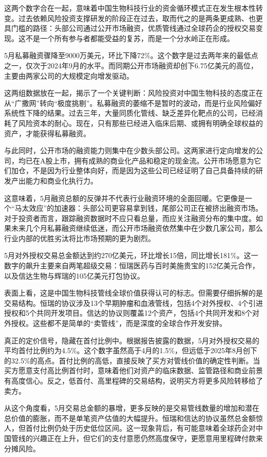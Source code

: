 \documentclass[11pt]{ctexart}
\begin{document}
这两个数字合在一起，意味着中国生物科技行业的资金循环模式正在发生根本性转变。过去依赖风险投资支撑研发的阶段正在过去，取而代之的是两条更成熟、也更具门槛的路径：头部公司通过公开市场融资，优质管线通过全球药企的授权交易变现。这不是一个所有参与者都能受益的复苏，而是一个分水岭正在形成。

5月私募融资骤降至9000万美元，环比下降72\%。这个数字是过去两年来的最低点之一，仅次于2024年9月的水平。而同期公开市场融资却创下6.75亿美元的高位，主要由两家公司的大规模定向增发驱动。

这两组数据放在一起，揭示了一个关键判断：风险投资对中国生物科技的态度正在从“广撒网”转向“极度挑剔”。私募融资的萎缩不是暂时的波动，而是行业风险偏好系统性下降的结果。过去三年，大量同质化管线、缺乏差异化靶点的公司，已经消耗了风险资本的耐心。现在，只有那些已经进入临床后期、或拥有明确全球权益的资产，才能获得私募融资。

与此同时，公开市场的融资能力则集中在少数头部公司。这两家进行定向增发的公司，均已在A股上市，拥有成熟的商业化产品和稳定的现金流。公开市场愿意为它们加仓，不是因为行业整体向好，而是因为这些公司已经证明了自己具备持续的研发产出能力和商业化执行力。

这意味着，5月融资总额的反弹并不代表行业融资环境的全面回暖。它更像是一个“马太效应”的加速器：头部公司更容易拿到钱，尾部公司正在被挤出融资市场。对于投资者而言，跟踪融资数据时不应只看总量，而应关注融资分布的集中度。如果未来几个月私募融资继续低迷，而公开市场融资依然集中在少数几家公司，那么行业内部的优胜劣汰将比市场预期的更为剧烈。

5月对外授权交易总金额达到约270亿美元，环比增长15倍，同比增长181\%。这一数字的飙升主要来自两笔超级交易：恒瑞医药与百时美施贵宝的152亿美元合作，以及信达生物与辉瑞的105亿美元打包协议。

表面上看，这是中国生物科技管线全球价值获得认可的标志。但需要仔细拆解的是交易结构。恒瑞的协议涉及13个早期肿瘤和血液管线，包括4个对外授权、4个引进授权和5个共同开发项目。信达的协议则覆盖12个资产，包括4个共同开发和8个对外授权。这些都不是简单的“卖管线”，而是深度的全球合作开发安排。

真正的定价信号，隐藏在首付比例中。根据报告披露的数据，5月对外授权交易的平均首付比例约为4.5\%。这个数字虽然高于4月的1.5\%，但远低于2025年8月创下的32.5\%的高点。首付比例的高低，直接反映了买方对管线价值的确定性判断。当买方愿意支付高比例首付时，意味着他们对资产的临床数据、监管路径和商业前景有高度信心。反之，低首付、高里程碑的交易结构，说明买方将更多风险转移给了卖方。

从这个角度看，5月交易总金额的暴增，更多反映的是交易管线数量的增加和潜在总价值的膨胀，而不是单笔资产估值的大幅提升。恒瑞和信达的协议虽然总金额惊人，但首付比例仍处于历史低位区间。这一现象背后，有可能意味着全球药企对中国管线的兴趣正在上升，但它们的支付意愿仍然高度保守，更愿意用里程碑付款来分摊风险。
\end{document}
